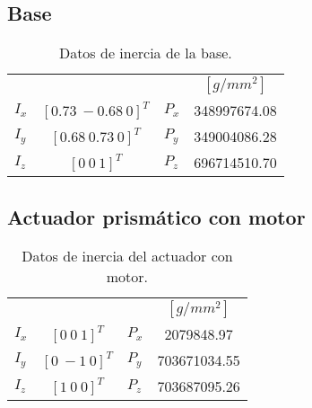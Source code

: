 \subsection{Base}

% 

\begin{table}[hb!]
 \begin{center}
\begin{tabular}{lclc}
 & & & $[g/mm^2]$\\
 $ I_x $ & $ [0.73\ -0.68\ 0]^T $ & $ P_x $ & 348997674.08\\
 $ I_y $ & $ [0.68\ 0.73\ 0]^T $ & $ P_y $ & 349004086.28\\
 $ I_z $ & $ [0 \ 0 \ 1]^T $ & $ P_z $ & 696714510.70
\end{tabular}
\end{center}
\caption{Datos de inercia de la base.}
\label{tab: inertia table base}
\end{table}

\subsection{Actuador prismático con motor}
\begin{table}[hb!]
 \begin{center}
\begin{tabular}{lclc}


% 


 & & & $[g/mm^2]$\\
 $ I_x $ & $ [0 \ 0 \ 1]^T $ & $ P_x $ & 2079848.97\\
 $ I_y $ & $ [0 \ -1 \ 0]^T $ & $ P_y $ & 703671034.55\\
 $ I_z $ & $ [1 \ 0 \ 0]^T $ & $ P_z $ & 703687095.26
\end{tabular}
\end{center}
\caption{Datos de inercia del actuador con motor.}
\label{tab: inertia table motor}
\end{table}

